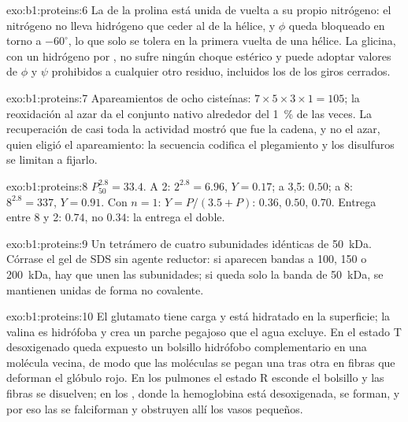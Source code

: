 \begin{solution}{exo:b1:proteins:6}
La  de la prolina está unida de vuelta a su propio nitrógeno:
el nitrógeno no lleva hidrógeno que ceder al  de la
hélice, y $\phi$ queda bloqueado en torno a $-60^\circ$, lo que solo se
tolera en la primera vuelta de una hélice. La glicina, con un hidrógeno por
, no sufre ningún choque estérico y puede adoptar valores de
$\phi$ y $\psi$ prohibidos a cualquier otro residuo, incluidos los de los
giros cerrados.
\end{solution}

\begin{solution}{exo:b1:proteins:7}
Apareamientos de ocho cisteínas: $7\times 5\times 3\times 1 = 105$; la
reoxidación al azar da el conjunto nativo alrededor del \qty{1}{\%} de las
veces. La recuperación de casi toda la actividad mostró que fue la cadena, y
no el azar, quien eligió el apareamiento: la secuencia codifica el
plegamiento y los disulfuros se limitan a fijarlo.
\end{solution}

\begin{solution}{exo:b1:proteins:8}
$P_{50}^{2.8} = 33.4$. A 2: $2^{2.8} = 6.96$, $Y = 0.17$; a 3,5: $0.50$; a
8: $8^{2.8} = 337$, $Y = 0.91$. Con $n = 1$: $Y =
P/(3.5 + P)$: $0.36$,
$0.50$, $0.70$. Entrega entre 8 y 2:  $0.74$, no 
$0.34$: la   entrega el doble.
\end{solution}

\begin{solution}{exo:b1:proteins:9}
Un tetrámero de cuatro subunidades idénticas de \qty{50}{kDa}. Córrase el
gel de SDS sin agente reductor: si aparecen bandas a 100, 150 o
\qty{200}{kDa}, hay  que unen las subunidades; si queda
solo la banda de \qty{50}{kDa}, se mantienen unidas de forma no covalente.
\end{solution}

\begin{solution}{exo:b1:proteins:10}
El glutamato tiene carga y está hidratado en la superficie; la valina es
hidrófoba y crea un parche pegajoso que el agua excluye. En el estado T
desoxigenado queda expuesto un bolsillo hidrófobo complementario en una
molécula vecina, de modo que las moléculas se pegan una tras otra en fibras
que deforman el glóbulo rojo. En los pulmones el estado R esconde el
bolsillo y las fibras se disuelven; en los , donde la hemoglobina
está desoxigenada, se forman, y por eso las  se falciforman y
obstruyen allí los vasos pequeños.
\end{solution}

